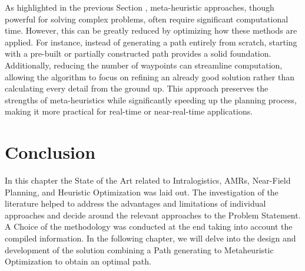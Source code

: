 As highlighted in the previous Section , meta-heuristic approaches, though powerful for solving complex problems, 
often require significant computational time. However, this can be greatly reduced by optimizing how these 
methods are applied. For instance, instead of generating a path entirely from scratch, starting with a pre-built 
or partially constructed path provides a solid foundation. Additionally, reducing the number of waypoints 
can streamline computation, allowing the algorithm to focus on refining an already good solution rather 
than calculating every detail from the ground up. This approach preserves the strengths of meta-heuristics 
while significantly speeding up the planning process, making it more practical for real-time or near-real-time 
applications.

\section*{Conclusion}

In this chapter the State of the Art related to Intralogistics, AMRs, Near-Field Planning, and Heuristic 
Optimization was laid out. The investigation of the literature helped to address the advantages and limitations
of individual approaches and decide around the relevant approaches to the Problem Statement. 
A Choice of the methodology was conducted at the end taking into account the compiled information.
In the following chapter, we will delve into the design and development of the solution 
combining a Path generating to Metaheuristic Optimization to obtain an optimal path.

